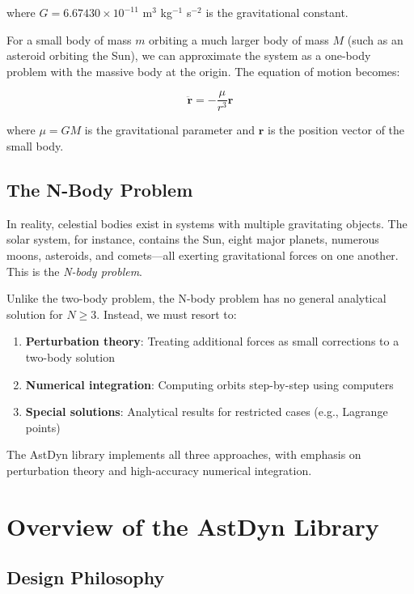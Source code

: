where $G = 6.67430 \times 10^{-11}$ m$^3$ kg$^{-1}$ s$^{-2}$ is the gravitational constant.

For a small body of mass $m$ orbiting a much larger body of mass $M$ (such as an asteroid orbiting the Sun), we can approximate the system as a one-body problem with the massive body at the origin. The equation of motion becomes:

\begin{equation}
\ddot{\mathbf{r}} = -\frac{\mu}{r^3}\mathbf{r}
\end{equation}

where $\mu = GM$ is the gravitational parameter and $\mathbf{r}$ is the position vector of the small body.

\subsection{The N-Body Problem}

In reality, celestial bodies exist in systems with multiple gravitating objects. The solar system, for instance, contains the Sun, eight major planets, numerous moons, asteroids, and comets—all exerting gravitational forces on one another. This is the \textit{N-body problem}.

Unlike the two-body problem, the N-body problem has no general analytical solution for $N \geq 3$. Instead, we must resort to:

\begin{enumerate}
    \item \textbf{Perturbation theory}: Treating additional forces as small corrections to a two-body solution
    \item \textbf{Numerical integration}: Computing orbits step-by-step using computers
    \item \textbf{Special solutions}: Analytical results for restricted cases (e.g., Lagrange points)
\end{enumerate}

The AstDyn library implements all three approaches, with emphasis on perturbation theory and high-accuracy numerical integration.

\section{Overview of the AstDyn Library}

\subsection{Design Philosophy}


